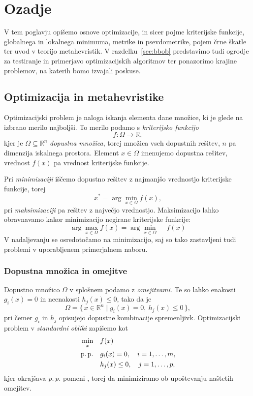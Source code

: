\documentclass[a4paper, 12pt]{book}
\begin{document}
\chapter{Ozadje}

V tem poglavju opišemo osnove optimizacije, in sicer pojme kriterijske funkcije, globalnega in lokalnega minimuma, metrike in psevdometrike, pojem črne škatle ter uvod v teorijo metahevristik. V razdelku~\ref{sec:bbob} predstavimo tudi ogrodje za testiranje in primerjavo optimizacijskih algoritmov ter ponazorimo krajine problemov, na katerih bomo izvajali poskuse.

\section{Optimizacija in metahevristike}

Optimizacijski problem je naloga iskanja elementa dane množice, ki je glede
na izbrano merilo najboljši. To merilo podamo s \emph{kriterijsko funkcijo}
\[
    f \colon \Omega \to \mathbb{R},
\]
kjer je $\Omega \subseteq \mathbb{R}^n$ \emph{dopustna množica}, torej množica
vseh dopustnih rešitev, $n$ pa dimenzija iskalnega prostora. Element
$x \in \Omega$ imenujemo dopustna rešitev, vrednost $f(x)$ pa vrednost kriterijske funkcije.

Pri \emph{minimizaciji} iščemo dopustno rešitev z najmanjšo vrednostjo kriterijske funkcije, torej
\[
    x^{*} = \arg\min_{x \in \Omega} f(x),
\]
pri \emph{maksimizaciji} pa rešitev z največjo vrednostjo. Maksimizacijo lahko obravnavamo kakor minimizacijo negirane kriterijske funkcije:
\[
\arg\max_{x \in \Omega}f(x)  = \arg\min_{x \in \Omega}-f(x)
\]
V nadaljevanju se osredotočamo na minimizacijo, saj so tako zastavljeni tudi problemi v
uporabljenem primerjalnem naboru.

\subsection{Dopustna množica in omejitve}

Dopustno množico $\Omega$ v splošnem podamo z \emph{omejitvami}. Te so lahko
enakosti $g_i(x) = 0$ in neenakosti $h_j(x) \le 0$, tako da je
\[
    \Omega = \{\, x \in \mathbb{R}^n \mid g_i(x) = 0,\ h_j(x) \le 0 \,\},
\]
pri čemer $g_i$ in $h_j$ opisujejo dopustne kombinacije spremenljivk.
Optimizacijski problem v \emph{standardni obliki} zapišemo kot
\[
    \begin{aligned}
        \min_x \quad & f(x) \\
        \text{p.\,p.} \quad & g_i(x) = 0, \quad i = 1,\dots,m, \\
                            & h_j(x) \le 0, \quad j = 1,\dots,p,
    \end{aligned}
\]
kjer okrajšava \emph{p.\,p.} pomeni , torej da minimiziramo ob
upoštevanju naštetih omejitev.
 
\end{document}
